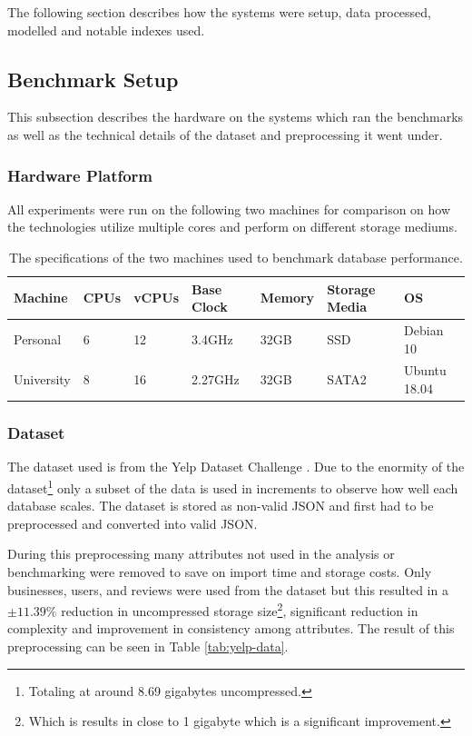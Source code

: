 The following section describes how the systems were setup, data processed, modelled and notable indexes used.

\subsection{Benchmark Setup}

This subsection describes the hardware on the systems which ran the benchmarks as well as the technical details of the dataset and preprocessing it went under.

\subsubsection{Hardware Platform}

All experiments were run on the following two machines for comparison on how the technologies utilize multiple cores and perform on different storage mediums.

\begin{table}[h!]
\centering
\begin{tabular}{ |p{2cm}|p{1.5cm}|p{1.5cm}|p{1.6cm}|p{1.5cm}|p{2cm}|p{2cm}|}
 \hline
 \rowcolor{Gray}
 Machine & CPUs & vCPUs & Base Clock & Memory & Storage Media & OS \\
 \hline
 Personal & 6 & 12 & 3.4GHz & 32GB & SSD & Debian 10 \\
 University & 8 & 16 & 2.27GHz & 32GB & SATA2 & Ubuntu 18.04 \\
 \hline
\end{tabular}
\vspace*{5mm}
\caption{The specifications of the two machines used to benchmark database performance.}
\label{tab:hardware}
\end{table}

\subsubsection{Dataset}
The dataset used is from the Yelp Dataset Challenge \cite{yelpdataset}. Due to the enormity of the dataset\footnote{Totaling at around 8.69 gigabytes uncompressed.} only a subset of the data is used in increments to observe how well each database scales. The dataset is stored as non-valid JSON and first had to be preprocessed and converted into valid JSON. 

During this preprocessing many attributes not used in the analysis or benchmarking were removed to save on import time and storage costs. Only businesses, users, and reviews were used from the dataset but this resulted in a $\pm11.39\%$ reduction in uncompressed storage size\footnote{Which is results in close to 1 gigabyte which is a significant improvement.}, significant reduction in complexity and improvement in consistency among attributes. The result of this preprocessing can be seen in Table \ref{tab:yelp-data}.

